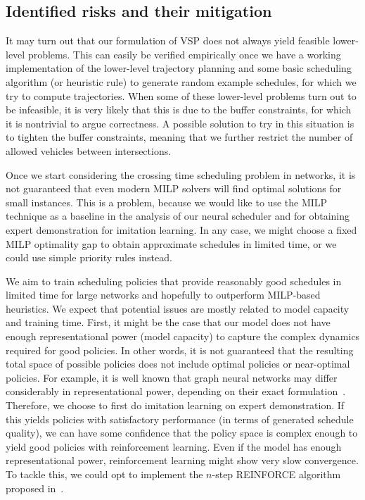 \documentclass{article}
\theoremstyle{definition}
\theoremstyle{plain}
\begin{document}
\subsection{Identified risks and their mitigation}

It may turn out that our formulation of VSP does not always yield feasible
lower-level problems. This can easily be verified empirically once we have a
working implementation of the lower-level trajectory planning and some basic
scheduling algorithm (or heuristic rule) to generate random example schedules,
for which we try to compute trajectories. When some of these lower-level
problems turn out to be infeasible, it is very likely that this is due to the
buffer constraints, for which it is nontrivial to argue correctness. A possible
solution to try in this situation is to tighten the buffer constraints, meaning
that we further restrict the number of allowed vehicles between intersections.

Once we start considering the crossing time scheduling problem in networks, it
is not guaranteed that even modern MILP solvers will find optimal solutions for
small instances. This is a problem, because we would like to use the MILP
technique as a baseline in the analysis of our neural scheduler and for
obtaining expert demonstration for imitation learning. In any case, we might
choose a fixed MILP optimality gap to obtain approximate schedules in limited
time, or we could use simple priority rules instead.

We aim to train scheduling policies that provide reasonably good schedules in
limited time for large networks and hopefully to outperform MILP-based
heuristics. We expect that potential issues are mostly related to model capacity
and training time.
First, it might be the case that our model does not have enough representational power
(model capacity) to capture the complex dynamics required for good policies. In
other words, it is not guaranteed that the resulting total space of possible
policies does not include optimal policies or near-optimal policies. For
example, it is well known that graph neural networks may differ considerably in
representational power, depending on their exact
formulation~\cite{xuHowPowerfulAre2019}.
%
Therefore, we choose to first do imitation learning on expert demonstration. If
this yields policies with satisfactory performance (in terms of generated
schedule quality), we can have some confidence that the policy space is complex
enough to yield good policies with reinforcement learning.
Even if the model has enough representational power, reinforcement learning
might show very slow convergence. To tackle this, we could opt to implement the
$n$-step REINFORCE algorithm proposed in~\cite{zhangDeepReinforcementLearning2024}.
\end{document}
